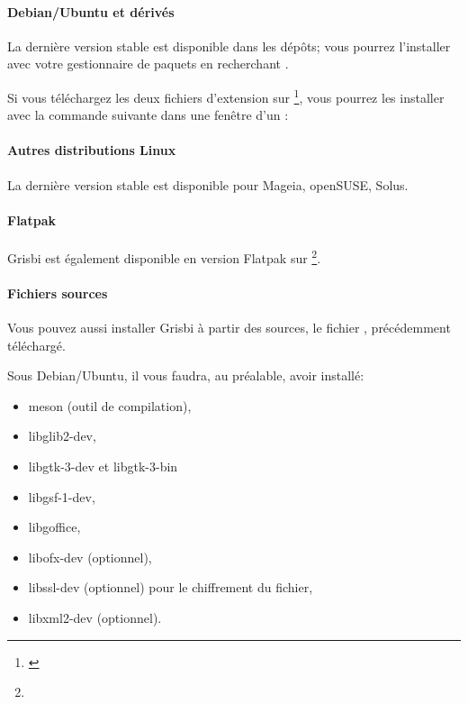 \paragraph{Debian/Ubuntu et dérivés}\mbox{}		%

La dernière version stable est disponible dans les dépôts; vous pourrez l'installer avec votre gestionnaire de paquets en recherchant .

Si vous téléchargez les deux fichiers d'\gls{extension}  sur \footnote{\label{fn:sourceforgeStable}\urlSourceForgeGrisbiStable},%
 vous pourrez les installer avec la commande suivante dans une fenêtre d'un :


\paragraph{Autres distributions Linux}\mbox{}		%

La dernière version stable est disponible pour Mageia, openSUSE, Solus.

\paragraph{Flatpak}\mbox{}		%

Grisbi est également disponible en version Flatpak sur \footnote{\urlFlatpakGrisbi}.

\paragraph{Fichiers sources}\mbox{}		%

Vous pouvez aussi installer Grisbi à partir des sources, le fichier , précédemment téléchargé.

Sous Debian/Ubuntu, il vous faudra, au préalable, avoir installé:
\begin{itemize}
	\item meson (outil de compilation),
	\item libglib2-dev,
	\item libgtk-3-dev et libgtk-3-bin
	\item libgsf-1-dev,
	\item libgoffice,
	\item libofx-dev (optionnel),
	\item libssl-dev (optionnel) pour le chiffrement du fichier,
	\item libxml2-dev (optionnel).
\end{itemize}

